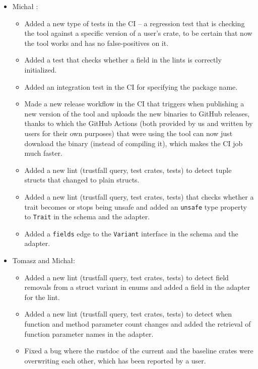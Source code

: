 \documentclass[licencjacka,en]{pracamgr}
\begin{document}
\begin{itemize}
	\item Michał \cite{responsibilities_michal}:
		\begin{itemize}
			\item Added a new type of tests in the CI -- a regression test
				that is checking the tool against a specific version of a user's crate,
				to be certain that now the tool works and has
				no false-positives on it.
			\item Added a test that checks whether a field in the lints
				is correctly initialized.
			\item Added an integration test in the CI for specifying the package name.
			\item Made a new release workflow in the CI that triggers when publishing
				a new version of the tool and uploads the new binaries to GitHub releases,
				thanks to which the GitHub Actions
				(both provided by us and written by users for their own purposes) that were using the tool
				can now just download the binary (instead of compiling it),
				which makes the CI job much faster.
			\item Added a new lint (trustfall query, test crates, tests)
				to detect tuple structs that changed to plain structs.
			\item Added a new lint (trustfall query, test crates, tests) that checks whether a trait
				becomes or stops being unsafe and added an \texttt{unsafe} type
				property to \texttt{Trait} in the schema and the adapter.
			\item Added a \texttt{fields} edge to the \texttt{Variant} interface
				in the schema and the adapter.
		\end{itemize}

	\item Tomasz and Michał:
		\begin{itemize}
			\item Added a new lint (trustfall query, test crates, tests) to
				detect field removals from a struct variant in enums
				and added a field in the adapter for the lint.
			\item Added a new lint (trustfall query, test crates, tests)
				to detect when function and method parameter count changes
				and added the retrieval of function parameter names in the adapter.
			\item Fixed a bug where the rustdoc of the current and the baseline crates
				were overwriting each other,
				which has been reported by a user.
		\end{itemize}


\end{itemize}
\end{document}
